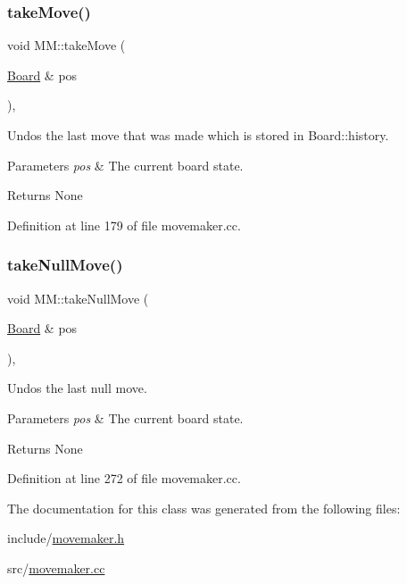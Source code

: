 \subsubsection{\texorpdfstring{take\+Move()}{takeMove()}}
{\footnotesize\ttfamily void M\+M\+::take\+Move (\begin{DoxyParamCaption}\item[{\mbox{\hyperlink{classBoard}{Board}} \&}]{pos }\end{DoxyParamCaption})\hspace{0.3cm}{\ttfamily [static]}, {\ttfamily [noexcept]}}



Undos the last move that was made which is stored in Board\+::history. 


\begin{DoxyParams}{Parameters}
{\em pos} & The current board state. \\
\hline
\end{DoxyParams}
\begin{DoxyReturn}{Returns}
None 
\end{DoxyReturn}


Definition at line 179 of file movemaker.\+cc.

\mbox{\label{classMM_aabe809e8405f8ea0666a7d6e25aedac5}} 
\subsubsection{\texorpdfstring{take\+Null\+Move()}{takeNullMove()}}
{\footnotesize\ttfamily void M\+M\+::take\+Null\+Move (\begin{DoxyParamCaption}\item[{\mbox{\hyperlink{classBoard}{Board}} \&}]{pos }\end{DoxyParamCaption})\hspace{0.3cm}{\ttfamily [static]}, {\ttfamily [noexcept]}}



Undos the last null move. 


\begin{DoxyParams}{Parameters}
{\em pos} & The current board state. \\
\hline
\end{DoxyParams}
\begin{DoxyReturn}{Returns}
None 
\end{DoxyReturn}


Definition at line 272 of file movemaker.\+cc.



The documentation for this class was generated from the following files\+:\begin{DoxyCompactItemize}
\item 
include/\mbox{\hyperlink{movemaker_8h}{movemaker.\+h}}\item 
src/\mbox{\hyperlink{movemaker_8cc}{movemaker.\+cc}}\end{DoxyCompactItemize}
